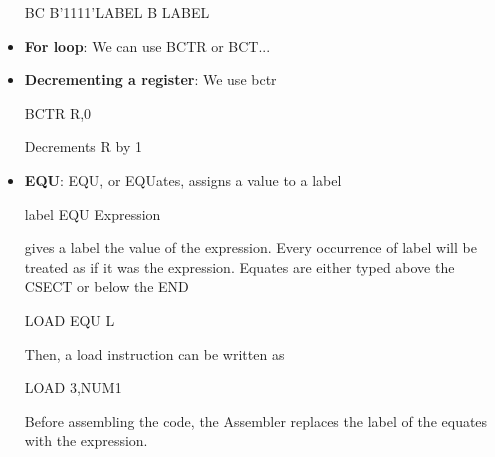 \documentclass{report}
\begin{document}
\begin{itemize}
\begin{cppcode}
                BC    B'1111'LABEL
                B     LABEL
                \end{cppcode}
        \item \textbf{For loop}: We can use BCTR or BCT...
        \item \textbf{Decrementing a register}: We use bctr
            \bigbreak \noindent 
            \begin{cppcode}
            BCTR  R,0
            \end{cppcode}
            \bigbreak \noindent 
            Decrements R by 1
        \item \textbf{EQU}: EQU, or EQUates, assigns a value to a label
            \bigbreak \noindent 
            \begin{cppcode}
            label    EQU    Expression
            \end{cppcode}
            \bigbreak \noindent 
            gives a label the value of the expression. Every occurrence of label will be treated as if it was the expression.
            \bigbreak \noindent 
            Equates are either typed above the CSECT or below the END
            \bigbreak \noindent 
            \begin{cppcode}
            LOAD  EQU  L
            \end{cppcode}
            \bigbreak \noindent 
            Then, a load instruction can be written as
            \bigbreak \noindent 
            \begin{cppcode}
            LOAD   3,NUM1
            \end{cppcode}
            \bigbreak \noindent 
            Before assembling the code, the Assembler replaces the label of the equates with the expression.
    \end{itemize}

    \pagebreak 
\end{document}
